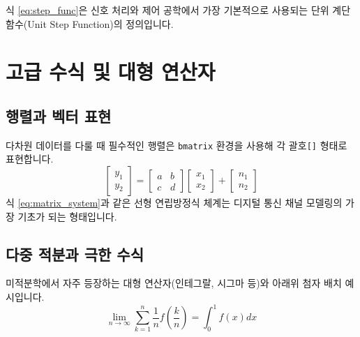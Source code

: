 \documentclass[12pt,a4paper,oneside]{memoir}
\begin{document}
식 \ref{eq:step_func}은 신호 처리와 제어 공학에서 가장 기본적으로 사용되는 단위 계단 함수(Unit Step Function)의 정의입니다.


\chapter{고급 수식 및 대형 연산자}

\section{행렬과 벡터 표현}
다차원 데이터를 다룰 때 필수적인 행렬은 \texttt{bmatrix} 환경을 사용해 각 괄호\texttt{[]} 형태로 표현합니다.
\begin{equation}
    \begin{bmatrix}
        y_1 \\
        y_2
    \end{bmatrix} = 
    \begin{bmatrix}
        a & b \\
        c & d
    \end{bmatrix}
    \begin{bmatrix}
        x_1 \\
        x_2
    \end{bmatrix} + 
    \begin{bmatrix}
        n_1 \\
        n_2
    \end{bmatrix} \label{eq:matrix_system}
\end{equation}
식 \ref{eq:matrix_system}과 같은 선형 연립방정식 체계는 디지털 통신 채널 모델링의 가장 기초가 되는 형태입니다.

\section{다중 적분과 극한 수식}
미적분학에서 자주 등장하는 대형 연산자(인테그랄, 시그마 등)와 아래위 첨자 배치 예시입니다.
\begin{equation}
    \lim_{n \to \infty} \sum_{k=1}^{n} \frac{1}{n} f\left(\frac{k}{n}\right) = \int_{0}^{1} f(x) dx
\end{equation}
\end{document}
